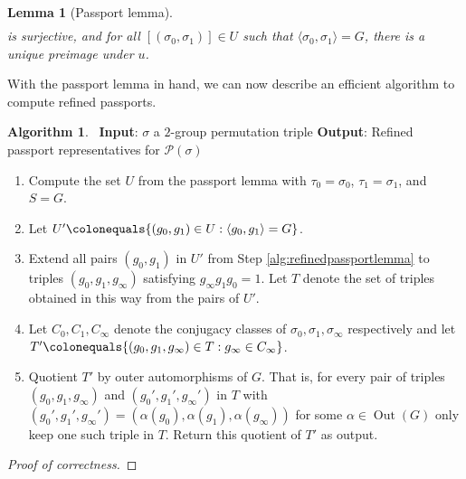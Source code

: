 \documentclass{dcthesis}
\DeclareMathOperator{\Out}{Out}
\numberwithin{equation}{section}
\newtheorem{lemma}[equation]{Lemma}
\theoremstyle{definition}
\newtheorem{alg}[equation]{Algorithm}
\theoremstyle{remark}
\begin{document}
{{{\begin{lemma}[Passport lemma]
\begin{align}
      \end{align}
      is surjective,
      and for all
      $[(\sigma_0,\sigma_1)]\in U$
      such that
      $\langle\sigma_0,\sigma_1\rangle=G$,
      there is a unique preimage under $u$.
    \end{lemma}
    With the passport lemma in hand,
    we can now describe an efficient algorithm
    to compute refined passports.
    \begin{alg}
      \label{alg:computerefinedpassport}
      \,
      \newline\textbf{Input}:
      $\sigma$ a $2$-group permutation triple
      \newline
      \textbf{Output}:
      Refined passport representatives for $\mathscr{P}(\sigma)$
      \begin{enumerate}
        \item
          Compute the set $U$ from the passport lemma
          with
          $\tau_0 = \sigma_0$,
          $\tau_1 = \sigma_1$,
          and $S = G$.
        \item
          \label{alg:refinedpassportlemma}
          Let
          $U'
          \colonequals
          \{
          (g_0,g_1)\in U :
          \langle g_0,g_1\rangle = G
          \}
          $.
        \item
          Extend all pairs
          $(g_0,g_1)$
          in $U'$ from
          Step
          \ref{alg:refinedpassportlemma}
          to triples
          $(g_0,g_1,g_\infty)$ satisfying
          $g_\infty g_1 g_0 = 1$.
          Let $T$ denote the set of triples
          obtained in this way from the pairs of $U'$.
        \item
          Let $C_0,C_1,C_\infty$
          denote the conjugacy classes of
          $\sigma_0,\sigma_1,\sigma_\infty$
          respectively and let
          $T'\colonequals
          \{(g_0,g_1,g_\infty)\in T : g_\infty\in C_\infty\}$.
        \item
          Quotient $T'$ by outer automorphisms
          of $G$.
          That is,
          for every pair of triples
          $(g_0,g_1,g_\infty)$
          and
          $(g_0',g_1',g_\infty')$
          in $T$ with
          $(g_0',g_1',g_\infty') =
          (\alpha(g_0),\alpha(g_1),\alpha(g_\infty))$
          for some $\alpha\in\Out(G)$
          only keep one such triple in $T$.
          Return this quotient of $T'$ as output.
      \end{enumerate}
    \end{alg}
    \begin{proof}[Proof of correctness]

\end{proof}}}}
\end{document}
